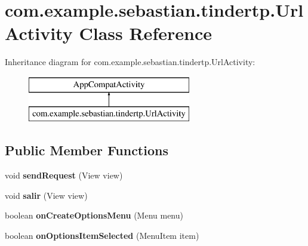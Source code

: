 \hypertarget{classcom_1_1example_1_1sebastian_1_1tindertp_1_1UrlActivity}{}\section{com.\+example.\+sebastian.\+tindertp.\+Url\+Activity Class Reference}
\label{classcom_1_1example_1_1sebastian_1_1tindertp_1_1UrlActivity}
Inheritance diagram for com.\+example.\+sebastian.\+tindertp.\+Url\+Activity\+:\begin{figure}[H]
\begin{center}
\leavevmode
\includegraphics[height=2.000000cm]{classcom_1_1example_1_1sebastian_1_1tindertp_1_1UrlActivity}
\end{center}
\end{figure}
\subsection*{Public Member Functions}
\begin{DoxyCompactItemize}
\item 
void {\bfseries send\+Request} (View view)\hypertarget{classcom_1_1example_1_1sebastian_1_1tindertp_1_1UrlActivity_ad9a6b6bdf98a40999f81ac4cfe491bae}{}\label{classcom_1_1example_1_1sebastian_1_1tindertp_1_1UrlActivity_ad9a6b6bdf98a40999f81ac4cfe491bae}

\item 
void {\bfseries salir} (View view)\hypertarget{classcom_1_1example_1_1sebastian_1_1tindertp_1_1UrlActivity_a0d0a80e70c2eda5021d5d7b557437720}{}\label{classcom_1_1example_1_1sebastian_1_1tindertp_1_1UrlActivity_a0d0a80e70c2eda5021d5d7b557437720}

\item 
boolean {\bfseries on\+Create\+Options\+Menu} (Menu menu)\hypertarget{classcom_1_1example_1_1sebastian_1_1tindertp_1_1UrlActivity_aa7e4452348e89b3415948d84b6268e3b}{}\label{classcom_1_1example_1_1sebastian_1_1tindertp_1_1UrlActivity_aa7e4452348e89b3415948d84b6268e3b}

\item 
boolean {\bfseries on\+Options\+Item\+Selected} (Menu\+Item item)\hypertarget{classcom_1_1example_1_1sebastian_1_1tindertp_1_1UrlActivity_ab3143cd88920f277a757af284d8baaab}{}\label{classcom_1_1example_1_1sebastian_1_1tindertp_1_1UrlActivity_ab3143cd88920f277a757af284d8baaab}

\end{DoxyCompactItemize}
